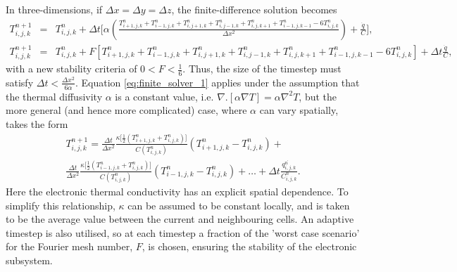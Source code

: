 In three-dimensions, if $\Delta x = \Delta y = \Delta z$, the 
finite-difference solution becomes
\begin{align}
T_{i,j,k}^{n+1}  &=& T_{i,j,k}^n + \Delta t \bigg[  \alpha \left(\frac{T_{i+1,j,k}^n + T_{i-1,j,k}^{n} + T_{i,j+1,k}^n + T_{i,j-1,k}^{n} + T_{i,j,k+1}^n + T_{i-1,j,k-1}^{n} - 6T_{i,j,k}^n}{\Delta x^2}\right) + \frac{\dot{q}}{C}  \bigg], \\
T_{i,j,k}^{n+1}  &=& T_{i,j,k}^n + F [T_{i+1,j,k}^n + T_{i-1,j,k}^{n} + T_{i,j+1,k}^n + T_{i,j-1,k}^{n} + T_{i,j,k+1}^n + T_{i-1,j,k-1}^{n} - 6T_{i,j,k}^n] +  \Delta t  \frac{\dot{q}}{C} \label{eq:finite_solver_1},
\end{align}
with a new stability criteria of $0 < F < \frac{1}{6}$. Thus, the size 
of the timestep must satisfy $\Delta t < \frac{\Delta x^2}{6 \alpha}$. 
Equation \ref{eq:finite_solver_1} applies under the assumption that 
the thermal diffusivity $\alpha$ is a constant value, i.e. 
$\nabla . [\alpha \nabla T ] = \alpha \nabla^2 T$, but the more general 
(and hence more complicated) case, where $\alpha$ can vary 
spatially, takes the form
\begin{multline}
T_{i,j,k}^{n+1}  =  \frac{\Delta t}{\Delta x^2}  \frac{\kappa \big[ \frac{1}{2} (T^n_{i+1,j,k} + T^n_{i,j,k})  \big]}{C(T^n_{i,j,k})} (T^n_{i+1,j,k} - T^n_{i,j,k}) + \\ 
\frac{\Delta t}{\Delta x^2}  \frac{\kappa \big[ \frac{1}{2} (T^n_{i-1,j,k} + T^n_{i,j,k})  \big]}{C(T^n_{i,j,k})} (T^n_{i-1,j,k} - T^n_{i,j,k})  + \dots + \Delta t \frac{\dot{q^n_{i,j,k}}}{C^n_{i,j,k}}.
\end{multline}
Here the electronic thermal conductivity has an explicit spatial 
dependence. To simplify this relationship, $\kappa$ can be assumed 
to be constant locally, and is taken to be the average value between 
the current and neighbouring cells. An adaptive timestep is also 
utilised, so at each timestep a fraction of the 'worst case scenario' 
for the Fourier mesh number, $F$, is chosen, ensuring the stability 
of the electronic subsystem.

